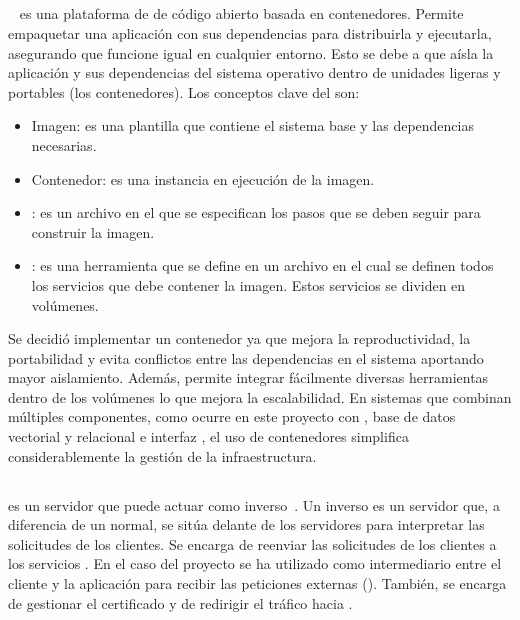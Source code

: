 \subsection{}\label{docker}
~\cite{herramienta:docker} es una plataforma de  de código abierto basada en contenedores. Permite empaquetar una aplicación con sus dependencias para distribuirla y ejecutarla, asegurando que funcione igual en cualquier entorno. Esto se debe a que aísla la aplicación y sus dependencias del sistema operativo dentro de unidades ligeras y portables (los contenedores). Los conceptos clave del  son:
\begin{itemize}
\tightlist
	\item Imagen: es una plantilla que contiene el sistema base y las dependencias necesarias.
	\item Contenedor: es una instancia en ejecución de la imagen.
	\item {}: es un archivo en el que se especifican los pasos que se deben seguir para construir la imagen.
	\item {}: es una herramienta que se define en un archivo  en el cual se definen todos los servicios que debe contener la imagen. Estos servicios se dividen en volúmenes. 
\end{itemize} 

Se decidió implementar un contenedor  ya que mejora la reproductividad, la portabilidad y evita conflictos entre las dependencias en el sistema aportando mayor aislamiento. Además, permite integrar fácilmente diversas herramientas dentro de los volúmenes lo que mejora la escalabilidad. En sistemas que combinan múltiples componentes, como ocurre en este proyecto con , base de datos vectorial y relacional e interfaz , el uso de contenedores simplifica considerablemente la gestión de la infraestructura.

\subsection{}\label{nginx}
 es un servidor  que puede actuar como  inverso~\cite{herramienta:proxyinverso}. Un  inverso es un servidor que, a diferencia de un  normal, se sitúa delante de los servidores  para interpretar las solicitudes de los clientes. Se encarga de reenviar las solicitudes de los clientes a los servicios . En el caso del proyecto  se ha utilizado como intermediario entre el cliente y la aplicación  para recibir las peticiones externas (). También, se encarga de gestionar el certificado  y de redirigir el tráfico hacia . 

